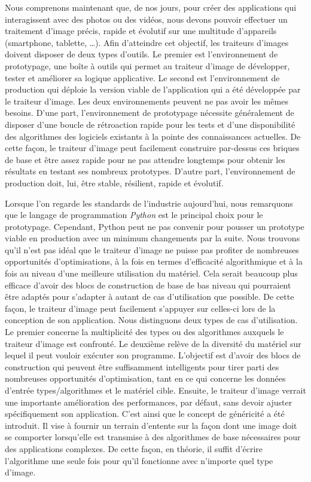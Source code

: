 Nous comprenons maintenant que, de nos jours, pour créer des applications qui interagissent avec des photos ou des
vidéos, nous devons pouvoir effectuer un traitement d'image précis, rapide et évolutif sur une multitude d'appareils
(smartphone, tablette, \ldots). Afin d'atteindre cet objectif, les traiteurs d'images doivent disposer de deux types
d'outils. Le premier est l'environnement de prototypage, une boîte à outils qui permet au traiteur d'image de
développer, tester et améliorer sa logique applicative. Le second est l'environnement de production qui déploie la
version viable de l'application qui a été développée par le traiteur d'image. Les deux environnements peuvent ne pas
avoir les mêmes besoins. D'une part, l'environnement de prototypage nécessite généralement de disposer d'une boucle de
rétroaction rapide pour les tests et d'une disponibilité des algorithmes des logiciels existants à la pointe des
connaissances actuelles. De cette façon, le traiteur d'image peut facilement construire par-dessus ces briques de base
et être assez rapide pour ne pas attendre longtemps pour obtenir les résultats en testant ses nombreux prototypes.
D'autre part, l'environnement de production doit, lui, être stable, résilient, rapide et évolutif.

Lorsque l'on regarde les standards de l'industrie aujourd'hui, nous remarquons que le langage de programmation
\emph{Python} est le principal choix pour le prototypage. Cependant, Python peut ne pas convenir pour pousser un
prototype viable en production avec un minimum changements par la suite. Nous trouvons qu'il n'est pas idéal que le
traiteur d'image ne puisse pas profiter de nombreuses opportunités d'optimisations, à la fois en termes d'efficacité
algorithmique et à la fois au niveau d'une meilleure utilisation du matériel. Cela serait beaucoup plus efficace d'avoir
des blocs de construction de base de bas niveau qui pourraient être adaptés pour s'adapter à autant de cas d'utilisation
que possible. De cette façon, le traiteur d'image peut facilement s'appuyer sur celles-ci lors de la conception de son
application. Nous distinguons deux types de cas d'utilisation. Le premier concerne la multiplicité des types ou des
algorithmes auxquels le traiteur d'image est confronté. Le deuxième relève de la diversité du matériel sur lequel il
peut vouloir exécuter son programme. L'objectif est d'avoir des blocs de construction qui peuvent être suffisamment
intelligents pour tirer parti des nombreuses opportunités d'optimisation, tant en ce qui concerne les données d'entrée
types/algorithmes et le matériel cible. Ensuite, le traiteur d'image verrait une importante amélioration des
performances, par défaut, sans devoir ajuster spécifiquement son application. C'est ainsi que le concept de généricité a
été introduit. Il vise à fournir un terrain d'entente sur la façon dont une image doit se comporter lorsqu'elle est
transmise à des algorithmes de base nécessaires pour des applications complexes. De cette façon, en théorie, il suffit
d'écrire l'algorithme une seule fois pour qu'il fonctionne avec n'importe quel type d'image.


